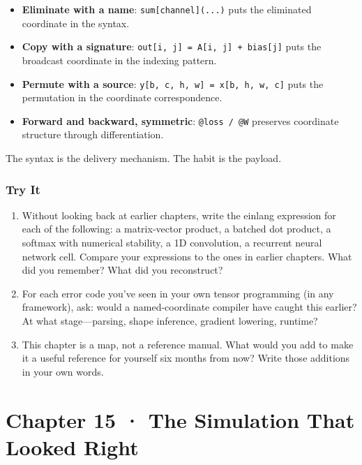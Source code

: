 \documentclass[11pt,]{article}
\providecommand{\tightlist}{%
  \setlength{\itemsep}{0pt}\setlength{\parskip}{0pt}}
\begin{document}
\begin{itemize}
\tightlist
\item
  \textbf{Eliminate with a name}: \texttt{sum{[}channel{]}(...)} puts
  the eliminated coordinate in the syntax.
\item
  \textbf{Copy with a signature}:
  \texttt{out{[}i,\ j{]}\ =\ A{[}i,\ j{]}\ +\ bias{[}j{]}} puts the
  broadcast coordinate in the indexing pattern.
\item
  \textbf{Permute with a source}:
  \texttt{y{[}b,\ c,\ h,\ w{]}\ =\ x{[}b,\ h,\ w,\ c{]}} puts the
  permutation in the coordinate correspondence.
\item
  \textbf{Forward and backward, symmetric}: \texttt{@loss\ /\ @W}
  preserves coordinate structure through differentiation.
\end{itemize}

The syntax is the delivery mechanism. The habit is the payload.

\hypertarget{try-it-13}{%
\subsubsection{Try It}\label{try-it-13}}

\begin{enumerate}
\def\labelenumi{\arabic{enumi}.}
\item
  Without looking back at earlier chapters, write the einlang expression
  for each of the following: a matrix-vector product, a batched dot
  product, a softmax with numerical stability, a 1D convolution, a
  recurrent neural network cell. Compare your expressions to the ones in
  earlier chapters. What did you remember? What did you reconstruct?
\item
  For each error code you've seen in your own tensor programming (in any
  framework), ask: would a named-coordinate compiler have caught this
  earlier? At what stage---parsing, shape inference, gradient lowering,
  runtime?
\item
  This chapter is a map, not a reference manual. What would you add to
  make it a useful reference for yourself six months from now? Write
  those additions in your own words.
\end{enumerate}

\newpage

\hypertarget{chapter-15-the-simulation-that-looked-right}{%
\section{Chapter 15 · The Simulation That Looked
Right}\label{chapter-15-the-simulation-that-looked-right}}
\end{document}
